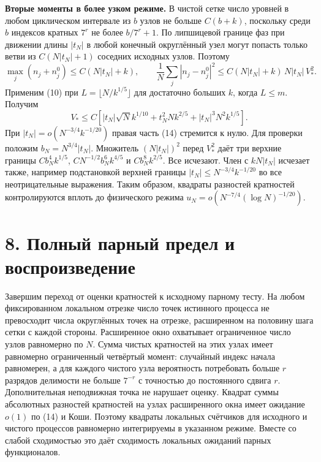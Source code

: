 \documentclass[11pt,a4paper]{article}
\newcommand{\sect}[1]{\section*{\sffamily\color{ink}#1}}
\newcommand{\subt}[1]{\par\medskip\noindent\textbf{#1.}\quad}
\begin{document}
\subt{Вторые моменты в более узком режиме} В чистой сетке число уровней в любом циклическом интервале из $b$ узлов не больше $C(b+k)$, поскольку среди $b$ индексов кратных $7^r$ не более $b/7^r+1$. По липшицевой границе фаз при движении длины $|t_N|$ в любой конечный округлённый узел могут попасть только ветви из $C(N|t_N|+1)$ соседних исходных узлов. Поэтому
\[
   \max_j(n_j+n_j^0)\le C(N|t_N|+k),\qquad
   \frac1N\sum_j |n_j-n_j^0|^2
                     \le C(N|t_N|+k)\,N|t_N|\,V_*^2 .              \tag{14}
\]
Применим (10) при $L=\lfloor N/k^{1/5}\rfloor$ для достаточно больших $k$, когда $L\le m$. Получим
\[
 V_*\le C\left[
 |t_N|\sqrt N k^{1/10}+t_N^2 N k^{2/5}
                         +|t_N|^3 N^2 k^{1/5}\right].
\]
При $|t_N|=o(N^{-3/4}k^{-1/20})$ правая часть (14) стремится к нулю. Для проверки положим $b_N=N^{3/4}|t_N|$. Множитель $(N|t_N|)^2$ перед $V_*^2$ даёт три верхние границы $C b_N^4 k^{1/5}$, $C N^{-1/2} b_N^6 k^{4/5}$ и $C b_N^8 k^{2/5}$. Все исчезают. Член с $kN|t_N|$ исчезает также, например подстановкой верхней границы $|t_N|\le N^{-3/4}k^{-1/20}$ во все неотрицательные выражения. Таким образом, квадраты разностей кратностей контролируются вплоть до физического режима $u_N=o(N^{-7/4}(\log N)^{-1/20})$.
\newpage
\sect{8. Полный парный предел и воспроизведение}
Завершим переход от оценки кратностей к исходному парному тесту. На любом фиксированном локальном отрезке число точек истинного процесса не превосходит числа округлённых точек на отрезке, расширенном на половину шага сетки с каждой стороны. Расширенное окно охватывает ограниченное число узлов равномерно по $N$. Сумма чистых кратностей на этих узлах имеет равномерно ограниченный четвёртый момент: случайный индекс начала равномерен, а для каждого чистого узла вероятность потребовать больше $r$ разрядов делимости не больше $7^{-r}$ с точностью до постоянного сдвига $r$. Дополнительная неподвижная точка не нарушает оценку. Квадрат суммы абсолютных разностей кратностей на узлах расширенного окна имеет ожидание $o(1)$ по (14) и Коши. Поэтому квадраты локальных счётчиков для исходного и чистого процессов равномерно интегрируемы в указанном режиме. Вместе со слабой сходимостью это даёт сходимость локальных ожиданий парных функционалов.
\end{document}

